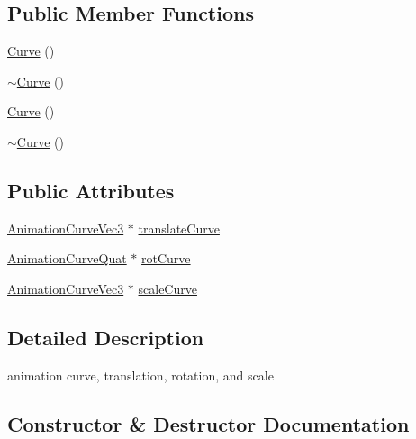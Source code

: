\subsection*{Public Member Functions}
\begin{DoxyCompactItemize}
\item 
\hyperlink{classAnimation3D_1_1Curve_acba3f6edfaff6526f054a8b7fce30d87}{Curve} ()
\item 
\hyperlink{classAnimation3D_1_1Curve_a93470b4d31b579919ca016a85eb0fb0d}{$\sim$\+Curve} ()
\item 
\hyperlink{classAnimation3D_1_1Curve_acba3f6edfaff6526f054a8b7fce30d87}{Curve} ()
\item 
\hyperlink{classAnimation3D_1_1Curve_a93470b4d31b579919ca016a85eb0fb0d}{$\sim$\+Curve} ()
\end{DoxyCompactItemize}
\subsection*{Public Attributes}
\begin{DoxyCompactItemize}
\item 
\hyperlink{classAnimationCurve}{Animation\+Curve\+Vec3} $\ast$ \hyperlink{classAnimation3D_1_1Curve_a12a49cdd9de1928a555c097b0593df79}{translate\+Curve}
\item 
\hyperlink{classAnimationCurve}{Animation\+Curve\+Quat} $\ast$ \hyperlink{classAnimation3D_1_1Curve_af6fa1e201c58c4f01dd221c4bdc0f3c9}{rot\+Curve}
\item 
\hyperlink{classAnimationCurve}{Animation\+Curve\+Vec3} $\ast$ \hyperlink{classAnimation3D_1_1Curve_a5e3b6cac30f4ede5a387a2766ea86704}{scale\+Curve}
\end{DoxyCompactItemize}


\subsection{Detailed Description}
animation curve, translation, rotation, and scale 

\subsection{Constructor \& Destructor Documentation}
\mbox{\label{classAnimation3D_1_1Curve_acba3f6edfaff6526f054a8b7fce30d87}} 

